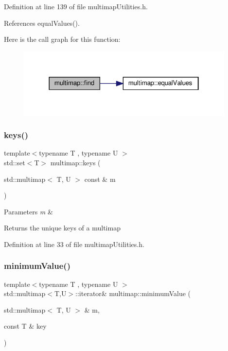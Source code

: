 Definition at line 139 of file multimap\+Utilities.\+h.



References equal\+Values().

Here is the call graph for this function\+:
\nopagebreak
\begin{figure}[H]
\begin{center}
\leavevmode
\includegraphics[width=310pt]{namespacemultimap_ad8171701d0a623e4623721cb1743196c_cgraph}
\end{center}
\end{figure}
\mbox{\label{namespacemultimap_a1d03380ed2365e307412efab3c41731f}} 
\subsubsection{\texorpdfstring{keys()}{keys()}}
{\footnotesize\ttfamily template$<$typename T , typename U $>$ \\
std\+::set$<$T$>$ multimap\+::keys (\begin{DoxyParamCaption}\item[{std\+::multimap$<$ T, U $>$ const \&}]{m }\end{DoxyParamCaption})}


\begin{DoxyParams}{Parameters}
{\em m} & \\
\hline
\end{DoxyParams}
\begin{DoxyReturn}{Returns}
the unique keys of a multimap 
\end{DoxyReturn}


Definition at line 33 of file multimap\+Utilities.\+h.

\mbox{\label{namespacemultimap_a94c77f5e6ac9c4eaeb34a6c142b6ab0d}} 
\subsubsection{\texorpdfstring{minimum\+Value()}{minimumValue()}}
{\footnotesize\ttfamily template$<$typename T , typename U $>$ \\
std\+::multimap$<$T,U$>$\+::iterator\& multimap\+::minimum\+Value (\begin{DoxyParamCaption}\item[{std\+::multimap$<$ T, U $>$ \&}]{m,  }\item[{const T \&}]{key }\end{DoxyParamCaption})}


